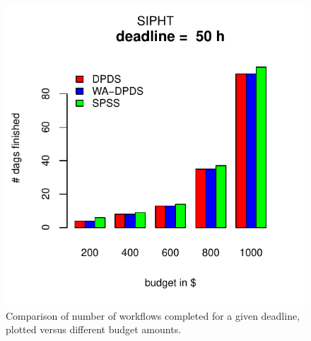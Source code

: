\documentclass{sig-alternate}
\begin{document}

\begin{figure}[htb] 
\centering
\includegraphics[width=0.6\columnwidth]{figures/pareto-budget-SIPHT-n-1000-8-dagh5-50h10m0.pdf}
\caption{Comparison of number of workflows completed for a given deadline,
plotted versus different budget amounts.}
\label{fig:budgets}
\end{figure}
\end{document}
